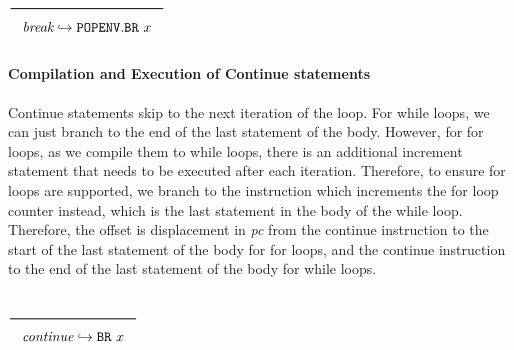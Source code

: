 $\Rule{}
{\textit{break} \translateaux \texttt{POPENV}.\texttt{BR}\ x}
$

\paragraph{Compilation and Execution of Continue statements}
Continue statements skip to the next iteration of the loop. For while loops,
we can just branch to the end of the last statement of the body. However, for
for loops, as we compile them to while loops, there is an additional
increment statement that needs to be executed after each iteration. Therefore,
to ensure for loops are supported, we branch to the instruction which increments
the for loop counter instead, which is the last statement in the body of the while loop.
Therefore, the offset is displacement in \textit{pc} from the
continue instruction to the start of the last statement of the body for for loops,
and the continue instruction to the end of the last statement of the body for while loops.

$\Rule{}
{\textit{continue} \translateaux \texttt{BR}\ x}
$
